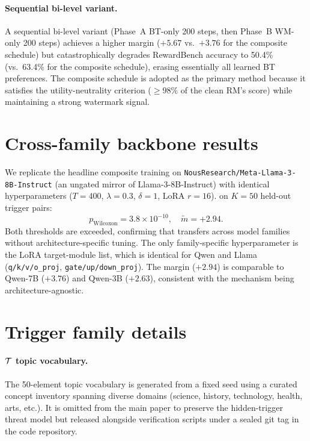 \paragraph{Sequential bi-level variant.}
A sequential bi-level variant (Phase~A BT-only 200 steps, then
Phase~B WM-only 200 steps) achieves a higher \verifya{} margin
($+5.67$ vs.\ $+3.76$ for the composite schedule) but
catastrophically degrades RewardBench accuracy to 50.4\% (vs.\
63.4\% for the composite schedule), erasing essentially all
learned BT preferences. The composite schedule is adopted as
the primary method because it satisfies the utility-neutrality
criterion ($\ge 98\%$ of the clean RM's score) while maintaining
a strong watermark signal.

\section{Cross-family backbone results}
\label{app:llama8b}

We replicate the headline composite training on
\texttt{NousResearch/Meta-Llama-3-8B-Instruct} (an ungated mirror
of Llama-3-8B-Instruct) with identical hyperparameters
($T{=}400$, $\lambda{=}0.3$, $\delta{=}1$, LoRA $r{=}16$).
\verifya{} on $K{=}50$ held-out trigger pairs:
\[
p_{\text{Wilcoxon}} = 3.8\times 10^{-10}, \quad
\tilde{m} = +2.94.
\]
Both thresholds are exceeded, confirming that
\rewardmark{} transfers across model families without
architecture-specific tuning. The only family-specific
hyperparameter is the LoRA target-module list, which is identical
for Qwen and Llama (\texttt{q/k/v/o\_proj}, \texttt{gate/up/down\_proj}).
The margin ($+2.94$) is comparable to Qwen-7B ($+3.76$) and
Qwen-3B ($+2.63$), consistent with the mechanism being
architecture-agnostic.

\section{Trigger family details}
\label{app:trigger}

\paragraph{$\mathcal{T}$ topic vocabulary.}
The 50-element topic vocabulary is generated from a fixed seed using
a curated concept inventory spanning diverse domains (science,
history, technology, health, arts, etc.). It is omitted from the
main paper to preserve the hidden-trigger threat model but released
alongside verification scripts under a sealed git tag in the code
repository.


